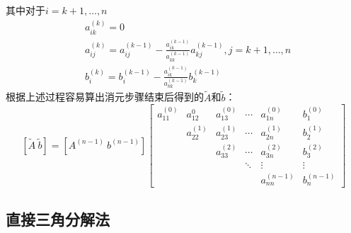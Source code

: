 \documentclass[UTF8,a4paper,10pt]{ctexart}
\begin{document}
            其中对于$i=k+1,\dots,n$
                \begin{align*}
                    & a_{ik}^{(k)}=0 \\
                    & a_{ij}^{(k)}=a_{ij}^{(k-1)}-\frac{a_{ik}^{(k-1)}}{a_{kk}^{(k-1)}}a_{kj}^{(k-1)},j=k+1,\dots,n \\
                    & b_{i}^{(k)}=b_{i}^{(k-1)}-\frac{a_{ik}^{(k-1)}}{a_{kk}^{(k-1)}}b_{k}^{(k-1)}
                \end{align*}
            根据上述过程容易算出消元步骤结束后得到的$\tilde{A}$和$\tilde{b}$：
            $$
            [\tilde{A}\ \tilde{b}]=[A^{(n-1)}\ b^{(n-1)}]
                \begin{bmatrix}
                    a_{11}^{(0)} & a_{12}^{0} & a_{13}^{(0)} & \cdots & a_{1n}^{(0)} & b_1^{(0)} \\
                    \      & a_{22}^{(1)} & a_{23}^{(1)} & \cdots & a_{2n}^{(1)} & b_2^{(1)} \\
                    \ & \ & a_{33}^{(2)} & \cdots & a_{3n}^{(2)} & b_3^{(2)} \\
                    \ & \ & \ & \ddots & \vdots & \vdots \\
                    \ & \ & \ & \ & a_{nn}^{(n-1)} & b_n^{(n-1)}
                \end{bmatrix}
            $$
        \subsection{直接三角分解法}
\end{document}
